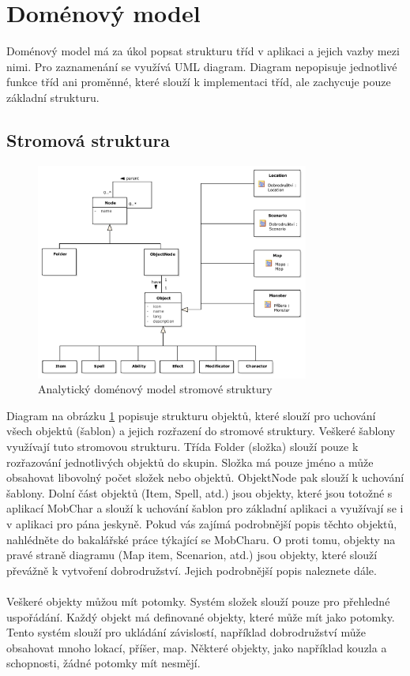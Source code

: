\documentclass[thesis=B,czech]{resources/FITthesis}[2012/06/26]
\begin{document}
	\section{Doménový model}
Doménový model má za úkol popsat strukturu tříd v aplikaci a jejich vazby mezi nimi. Pro zaznamenání se využívá UML diagram. Diagram nepopisuje jednotlivé funkce tříd ani proměnné, které slouží k implementaci tříd, ale zachycuje pouze základní strukturu.
\subsection{Stromová struktura}
\begin{figure}\centering
	\includegraphics[width=0.8\textwidth]{images/domain_struktura}
	\caption[Analytický doménový model stromové struktury]{Analytický doménový model stromové struktury}\label{fig:dm_stromova_struktura}
\end{figure}
Diagram na obrázku \ref{fig:dm_stromova_struktura} popisuje strukturu objektů, které slouží pro uchování všech objektů (šablon) a jejich rozřazení do stromové struktury. Veškeré šablony využívají tuto stromovou strukturu. Třída Folder (složka) slouží pouze k rozřazování jednotlivých objektů do skupin. Složka má pouze jméno a může obsahovat libovolný počet složek nebo objektů. ObjektNode pak slouží k uchování šablony. Dolní část objektů (Item, Spell, atd.) jsou objekty, které jsou totožné s aplikací MobChar a slouží k uchování šablon pro základní aplikaci a využívají se i v aplikaci pro pána jeskyně. Pokud vás zajímá podrobnější popis těchto objektů, nahlédněte do bakalářské práce týkající se MobCharu. O proti tomu, objekty na pravé straně diagramu (Map item, Scenarion, atd.) jsou objekty, které slouží převážně k vytvoření dobrodružství. Jejich podrobnější popis naleznete dále.\\
\\
Veškeré objekty můžou mít potomky. Systém složek slouží pouze pro přehledné uspořádání. Každý objekt má definované objekty, které může mít jako potomky. Tento systém slouží pro ukládání závislostí, například dobrodružství může obsahovat mnoho lokací, příšer, map. Některé objekty, jako například kouzla a schopnosti, žádné potomky mít nesmějí. 
\end{document}

